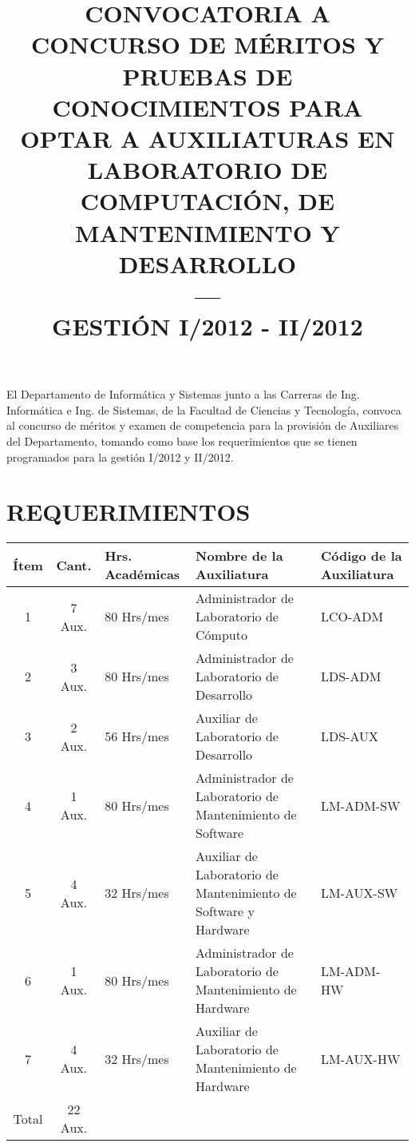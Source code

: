 \documentclass[letterpaper,11pt]{article}
\title{CONVOCATORIA A CONCURSO DE MÉRITOS Y PRUEBAS DE CONOCIMIENTOS PARA OPTAR
A AUXILIATURAS EN LABORATORIO DE COMPUTACIÓN, DE MANTENIMIENTO Y DESARROLLO \\
--- \\ GESTIÓN I/2012 - II/2012}
\date{}
\begin{document}
\maketitle
El Departamento de Informática y Sistemas junto a las Carreras de Ing. Informática e Ing. de Sistemas, de la Facultad de Ciencias y Tecnología, convoca al concurso de méritos y examen de competencia para la provisión de Auxiliares del Departamento, tomando como base los requerimientos que se tienen programados para la gestión I/2012 y II/2012.

\section{REQUERIMIENTOS}
\begin{tabular}{|c|c|p{2.8cm}|p{5.2cm}|p{2.8cm}|}
\hline
Ítem & Cant. & Hrs. Académicas & Nombre de la Auxiliatura & Código de la Auxiliatura \\
\hline
1 & 7 Aux. & 80 Hrs/mes & Administrador de Laboratorio de Cómputo & LCO-ADM \\
\hline
2 & 3 Aux. & 80 Hrs/mes & Administrador de Laboratorio de Desarrollo & LDS-ADM \\
\hline
3 & 2 Aux. & 56 Hrs/mes & Auxiliar de Laboratorio de Desarrollo & LDS-AUX \\
\hline
4 & 1 Aux. & 80 Hrs/mes & Administrador de Laboratorio de Mantenimiento de Software & LM-ADM-SW \\
\hline
5 & 4 Aux. & 32 Hrs/mes & Auxiliar de Laboratorio de Mantenimiento de Software y Hardware & LM-AUX-SW \\
\hline
6 & 1 Aux. & 80 Hrs/mes & Administrador de Laboratorio de Mantenimiento de Hardware & LM-ADM-HW \\
\hline
7 & 4 Aux. & 32 Hrs/mes & Auxiliar de Laboratorio de Mantenimiento de Hardware & LM-AUX-HW \\
\hline
Total & 22 Aux. & & & \\
\hline
\end{tabular}
\end{document}
